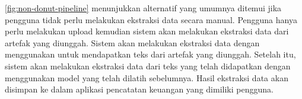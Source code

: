 \autoref{fig:non-donut-pipeline} menunjukkan alternatif yang umumnya ditemui jika pengguna tidak perlu melakukan ekstraksi data secara manual. Pengguna hanya perlu melakukan upload kemudian sistem akan melakukan ekstraksi data dari artefak yang diunggah. Sistem akan melakukan ekstraksi data dengan menggunakan \ocr{} untuk mendapatkan teks dari artefak yang diunggah. Setelah itu, sistem akan melakukan ekstraksi data dari teks yang telah didapatkan dengan menggunakan model yang telah dilatih sebelumnya. Hasil ekstraksi data akan disimpan ke dalam aplikasi pencatatan keuangan yang dimiliki pengguna.

